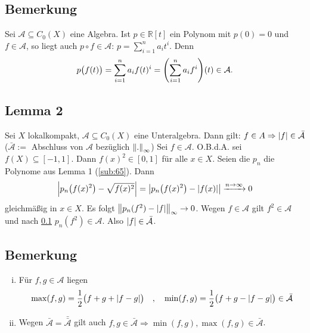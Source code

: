 \subsection[Bemerkung: Komposition mit Polynomen ist auch der Algebra]{Bemerkung} %
\label{sub:66}
Sei $\mathcal{A} \subseteq C_0(X)$ eine Algebra. Ist $p \in \mathds{R}[t]$ ein Polynom mit $p(0)=0$ und $f \in \mathcal{A}$, so liegt auch $p \circ f \in \mathcal{A}$:
$p= \sum_{i=1}^{n} a_i t^i$. Denn 
\[
	p\enbrace[\big]{f(t)} = \sum_{i=1}^{n} a_i f(t)^i = \enbrace*{\sum_{i=1}^{n} a_i f^i} (t) \in \mathcal{A}. 
\]

\subsection[Lemma 2: Betrag von $f \in \mathcal{A}$ liegt in $\bar{\mathcal{A}}$]{Lemma 2} %
\label{sub:67}
Sei $X$ lokalkompakt, $\mathcal{A} \subseteq C_0(X)$ eine Unteralgebra. Dann gilt: $f \in A \Rightarrow \abs*{f} \in \bar{\mathcal{A}}$ \\
{\color{light_gray} ($\bar{\mathcal{A} }:= $ Abschluss von $\mathcal{A}$ bezüglich $\norm[\infty]{.} $)}
Sei $f \in \mathcal{A}$. O.B.d.A. sei $f(X) \subseteq [{-1},1]$. Dann $f(x)^2 \in [0,1]$ für alle $x \in X$. Seien die $p_n$ die Polynome aus Lemma 1 (\ref{sub:65}). Dann
\begin{align*}
	\abs*{p_n \enbrace*{f(x)^2} - \sqrt{f(x)^2}} = \abs*{ p_n \enbrace*{f(x)^2} - \abs*{f(x)}} \xrightarrow{n \to \infty}  0 
\end{align*}
gleichmäßig in $x \in X$. Es folgt $\norm[\infty]{p_n(f^2) - \abs*{f} } \to 0 $. Wegen $f \in \mathcal{A} $ gilt $f^2 \in \mathcal{A}$ und nach \ref{sub:66} $p_n(f^2) \in \mathcal{A}$.
Also $\abs*{f} \in \bar{\mathcal{A}}$. \bewende

\subsection[Bemerkung: $\max, \min$ von Funktionen aus $\mathcal{A}$ liegen in $\bar{\mathcal{A}}$]{Bemerkung} %
\label{sub:68}
\begin{enumerate}[(i)]
	\item Für $f,g \in \mathcal{A}$ liegen 
	\[
		\max(f,g) = \frac{1}{2} \enbrace[\big]{f+g + \abs*{f-g}} \quad , \quad \min(f,g) = \frac{1}{2} \enbrace[\big]{f+g - \abs*{f-g} }  \in \Bar{\mathcal{A}}
	\]
	\item Wegen $\bar{\mathcal{A} } = \bar{\bar{\mathcal{A}}}$ gilt auch 
	$f,g \in \bar{\mathcal{A}} \Rightarrow \min(f,g), \max(f,g) \in \bar{\mathcal{A}}$. 
\end{enumerate}

